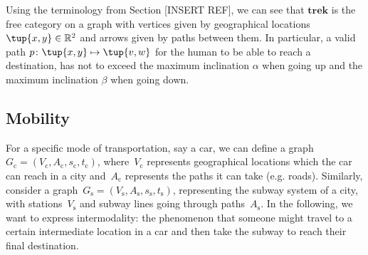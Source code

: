 

Using the terminology from Section [INSERT REF], we can see that $\mathbf{trek}$ is the free category on a graph with vertices given by geographical locations $\tup{x,y}\in \mathbb{R}^2$ and arrows given by paths between them. In particular, a valid path $p\colon \tup{x,y}\mapsto \tup{v,w}$ for the human to be able to reach a destination, has not to exceed the maximum inclination $\alpha$ when going up and the maximum inclination $\beta$ when going down.


\subsection{Mobility}

For a specific mode of transportation, say a car, we can define a graph~$G_\mathrm{c}=(V_\mathrm{c},A_\mathrm{c},s_\mathrm{c},t_\mathrm{c})$, where~$V_\mathrm{c}$ represents geographical locations which the car can reach in a city and~$A_\mathrm{c}$ represents the paths it can take (e.g. roads). Similarly, consider a graph~$G_\mathrm{s}=(V_\mathrm{s},A_\mathrm{s},s_\mathrm{s},t_\mathrm{s})$, representing the subway system of a city, with stations~$V_\mathrm{s}$ and subway lines going through paths~$A_\mathrm{s}$. In the following, we want to express intermodality: the phenomenon that someone might travel to a certain intermediate location in a car and then take the subway to reach their final destination. 

